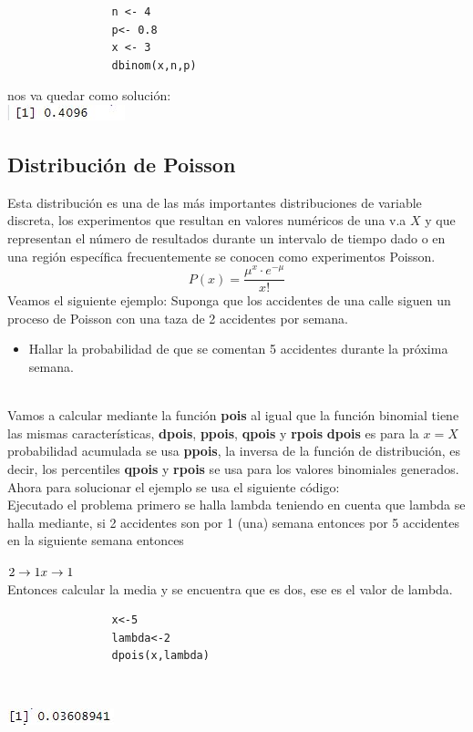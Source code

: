 \documentclass[12pt,hidelinks]{article}
\begin{document}
            \begin{lstlisting}
                n <- 4
                p<- 0.8
                x <- 3
                dbinom(x,n,p)
            \end{lstlisting}
			nos va quedar como solución:\\
		    \centering
            \includegraphics[scale=1]{binomial.JPG}\\
            \centering
            \caption{}
	\subsection{Distribución de Poisson}
			Esta distribución es una de las más importantes distribuciones de variable discreta, los experimentos que resultan en valores numéricos de una v.a $X$ y que representan el número de resultados durante un intervalo de tiempo dado o en una región específica frecuentemente se conocen como experimentos Poisson.
			\[
			P(x)=\frac{\mu^x \cdot e^{-\mu}}{x!}
			\]
			Veamos el siguiente ejemplo: Suponga que los accidentes de una calle siguen un proceso de Poisson con una taza de 2 accidentes por semana.\\
			\begin{itemize}
			    \item Hallar la probabilidad de que se comentan 5 accidentes durante la próxima semana.
			\end{itemize}\\
			Vamos a calcular mediante la función \textbf{pois} al igual que la función binomial tiene las mismas características,
			\textbf{dpois}, \textbf{ppois}, \textbf{qpois} y \textbf{rpois}
		    \textbf{dpois} es para la $x=X$ probabilidad acumulada se usa \textbf{ppois}, la inversa de la función de distribución, es decir, los percentiles \textbf{qpois} y \textbf{rpois} se usa para los valores binomiales generados.\\
		    Ahora para solucionar el ejemplo se usa el siguiente código:
		    \\
            Ejecutado el problema primero se halla lambda teniendo en cuenta que lambda se halla mediante, si 2 accidentes son por 1 (una) semana entonces por 5 accidentes en la siguiente semana entonces 
            \begin{center}
                $2\to 1 \\
                x\to 1
                $\\
                Entonces calcular la media y se encuentra que es dos, ese es el valor de lambda.
            \begin{lstlisting}
                x<-5
                lambda<-2
                dpois(x,lambda)
            \end{lstlisting}\\
            \end{center}
		    \centering
            \includegraphics[scale=1]{poisson.JPG}\\
            \centering
            \caption{}
            
\end{document}
